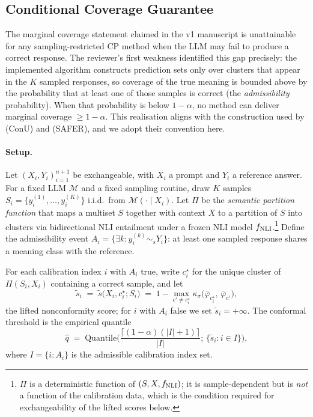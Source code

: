 
\subsection{Conditional Coverage Guarantee}
\label{sec:theorem}

The marginal coverage statement claimed in the v1 manuscript is unattainable
for any sampling-restricted CP method when the LLM may fail to produce a
correct response. The reviewer's first weakness identified this gap
precisely: the implemented algorithm constructs prediction sets only over
clusters that appear in the $K$ sampled responses, so coverage of the true
meaning is bounded above by the probability that at least one of those
samples is correct (the \emph{admissibility} probability). When that
probability is below $1 - \alpha$, no method can deliver marginal coverage
$\ge 1 - \alpha$. This realisation aligns with the construction used by
\citet{wang2024conu} (ConU) and \citet{liang2025safer} (SAFER), and we adopt
their convention here.

\paragraph{Setup.}
Let $(X_i, Y_i)_{i=1}^{n+1}$ be exchangeable, with $X_i$ a prompt and
$Y_i$ a reference answer. For a fixed LLM $\mathcal{M}$ and a fixed
sampling routine, draw $K$ samples $S_i = \{y_i^{(1)}, \dots, y_i^{(K)}\}$
i.i.d.\ from $\mathcal{M}(\cdot \mid X_i)$. Let $\Pi$ be the
\emph{semantic partition function} that maps a multiset $S$ together with
context $X$ to a partition of $S$ into clusters via bidirectional
NLI entailment under a frozen NLI model $f_{\rm NLI}$.\footnote{$\Pi$ is a
deterministic function of $(S, X, f_{\rm NLI})$; it is sample-dependent
but is \emph{not} a function of the calibration data, which is the
condition required for exchangeability of the lifted scores below.}
Define the admissibility event $A_i = \{\exists k : y_i^{(k)} \sim_s Y_i\}$:
at least one sampled response shares a meaning class with the reference.

For each calibration index $i$ with $A_i$ true, write $c_i^\star$ for the
unique cluster of $\Pi(S_i, X_i)$ containing a correct sample, and let
\[
  \tilde{s}_i \;=\; \tilde{s}\bigl(X_i, c_i^\star; S_i\bigr)
       \;=\; 1 - \max_{c' \neq c_i^\star} \kappa_\sigma\!\bigl(\bar\varphi_{c_i^\star},\, \bar\varphi_{c'}\bigr),
\]
the lifted nonconformity score; for $i$ with $A_i$ false we set
$\tilde{s}_i = +\infty$. The conformal threshold is the empirical quantile
\[
  \hat{q}
  \;=\; \mathrm{Quantile}\!\Biggl(
       \frac{\lceil (1-\alpha)(|I|+1)\rceil}{|I|};
       \,\bigl\{\tilde{s}_i : i \in I\bigr\}\Biggr),
\]
where $I = \{i : A_i\}$ is the admissible calibration index set.

